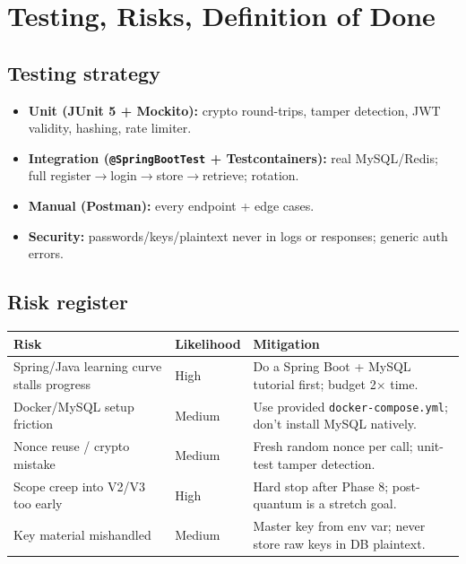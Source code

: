 \documentclass[11pt,a4paper]{article}
\newcommand{\code}[1]{\texttt{#1}}
\begin{document}
\section{Testing, Risks, Definition of Done}
\subsection{Testing strategy}
\begin{itemize}[leftmargin=*]
  \item \textbf{Unit (JUnit 5 + Mockito):} crypto round-trips, tamper detection, JWT validity, hashing, rate limiter.
  \item \textbf{Integration (\code{@SpringBootTest} + Testcontainers):} real MySQL/Redis; full register$\to$login$\to$store$\to$retrieve; rotation.
  \item \textbf{Manual (Postman):} every endpoint + edge cases.
  \item \textbf{Security:} passwords/keys/plaintext never in logs or responses; generic auth errors.
\end{itemize}

\subsection{Risk register}
\renewcommand{\arraystretch}{1.25}
\begin{longtable}{p{5cm} p{2cm} p{6cm}}
\hline
\textbf{Risk} & \textbf{Likelihood} & \textbf{Mitigation} \\ \hline
Spring/Java learning curve stalls progress & High & Do a Spring Boot + MySQL tutorial first; budget 2$\times$ time. \\
Docker/MySQL setup friction & Medium & Use provided \code{docker-compose.yml}; don't install MySQL natively. \\
Nonce reuse / crypto mistake & Medium & Fresh random nonce per call; unit-test tamper detection. \\
Scope creep into V2/V3 too early & High & Hard stop after Phase 8; post-quantum is a stretch goal. \\
Key material mishandled & Medium & Master key from env var; never store raw keys in DB plaintext. \\ \hline
\end{longtable}
\end{document}
